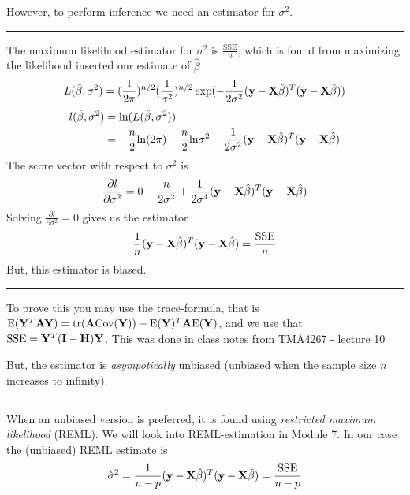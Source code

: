 \documentclass[
]{article}
\begin{document}
However, to perform inference we need an estimator for \(\sigma^2\).

\begin{center}\rule{0.5\linewidth}{0.5pt}\end{center}

The maximum likelihood estimator for \(\sigma^2\) is
\(\frac{\text{SSE}}{n}\), which is found from maximizing the likelihood
inserted our estimate of \(\hat{\beta}\)
\[L(\hat{\beta},{\sigma^2})=(\frac{1}{2\pi})^{n/2}(\frac{1}{\sigma^2})^{n/2}\exp(-\frac{1}{2\sigma^2} ({\bf y}-{\bf X}\hat{\beta})^T({\bf y}-{\bf X}\hat{\beta}))\]
\begin{align*}
l(\hat{\beta},{\sigma^2})&=\text{ln}(L(\hat{\beta},{\sigma^2}))\\
&=-\frac{n}{2}\text{ln}(2\pi)-\frac{n}{2}\text{ln}\sigma^2-\frac{1}{2\sigma^2} ({\bf y}-{\bf X}\hat{\beta})^T({\bf y}-{\bf X}\hat{\beta})\\
\end{align*} The score vector with respect to \(\sigma^2\) is
\[\frac{\partial l}{\partial \sigma^2}=0-\frac{n}{2\sigma^2}+\frac{1}{2\sigma^4}({\bf y}-{\bf X}\hat{\beta})^T({\bf y}-{\bf X}\hat{\beta}) \]
Solving \(\frac{\partial l}{\partial \sigma^2}=0\) gives us the
estimator
\[ \frac{1}{n}({\bf y}-{\bf X}\hat{\beta})^T({\bf y}-{\bf X}\hat{\beta})=\frac{\text{SSE}}{n}\]
But, this estimator is biased.

\begin{center}\rule{0.5\linewidth}{0.5pt}\end{center}

To prove this you may use the trace-formula, that is
\(\text{E}({\bf Y}^T {\bf A}{\bf Y})=\text{tr}({\bf A}\text{Cov}({\bf Y}))+\text{E}({\bf Y})^T{\bf A}\text{E}({\bf Y})\),
and we use that \(\text{SSE}={\bf Y}^T ({\bf I}-{\bf H}){\bf Y}\). This
was done in
\href{https://www.math.ntnu.no/emner/TMA4267/2017v/L10classnotes20170217.pdf}{class
notes from TMA4267 - lecture 10}

But, the estimator is \emph{asympotically} unbiased (unbiased when the
sample size \(n\) increases to infinity).

\begin{center}\rule{0.5\linewidth}{0.5pt}\end{center}

When an unbiased version is preferred, it is found using
\emph{restricted maximum likelihood} (REML). We will look into
REML-estimation in Module 7. In our case the (unbiased) REML estimate is
\[ \hat{\sigma}^2=\frac{1}{n-p}({\bf y}-{\bf X}\hat{\beta})^T({\bf y}-{\bf X}\hat{\beta})=\frac{\text{SSE}}{n-p}\]
\end{document}
